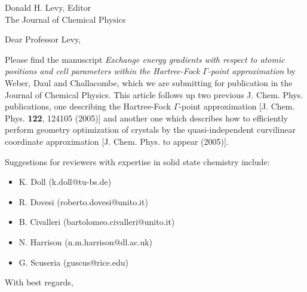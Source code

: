 
\pagestyle{empty}

\signature{V. Weber}

\address{
V. Weber \\
(valeryw@lanl.gov) \\
Theoretical Division \\
Group T-12, MS B268 \\
Los Alamos National Laboratory \\
Los Alamos, NM 87545 }

\date{February 6, 2006}

\begin{letter}{
    Donald H. Levy, Editor \\
    The Journal of Chemical Physics \\
}

\opening{Dear Professor Levy,}

Please find the manuscript {\em Exchange energy gradients with respect 
to atomic positions and cell parameters within the Hartree-Fock 
$\Gamma$-point approximation} by Weber, Daul and Challacombe, which we are 
submitting for publication in the Journal of Chemical Physics. 
This article follows up two previous J. Chem. Phys. publications, one 
describing the Hartree-Fock $\Gamma$-point approximation [J. Chem. Phys. {\bf 122}, 124105 (2005)] 
and another one which describes how to efficiently perform geometry optimization of crystals by the 
quasi-independent curvilinear coordinate approximation [J. Chem. Phys. to appear (2005)].

Suggestions for reviewers with expertise in solid state chemistry include: 
\begin{itemize}
\item K. Doll (k.doll@tu-bs.de)
\item R. Dovesi (roberto.dovesi@unito.it)
\item B. Civalleri (bartolomeo.civalleri@unito.it)
\item N. Harrison (n.m.harrison@dl.ac.uk)
\item G. Scuseria (guscus@rice.edu)
\end{itemize}

\closing{With best regards,}
\end{letter}

